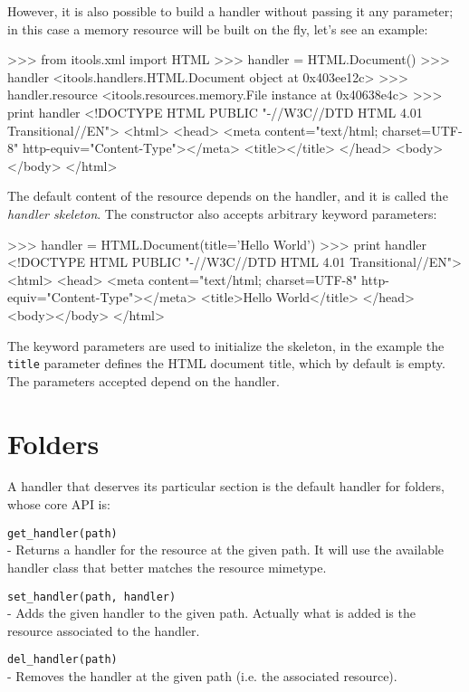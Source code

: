 However, it is also possible to build a handler without passing it any
parameter; in this case a memory resource will be built on the fly, let's
see an example:

\begin{code}
    >>> from itools.xml import HTML
    >>> handler = HTML.Document()
    >>> handler
    <itools.handlers.HTML.Document object at 0x403ee12c>
    >>> handler.resource
    <itools.resources.memory.File instance at 0x40638e4c>
    >>> print handler
    <!DOCTYPE HTML PUBLIC "-//W3C//DTD HTML 4.01 Transitional//EN">
    <html>
      <head>
        <meta content="text/html; charset=UTF-8" http-equiv="Content-Type"></meta>
        <title></title>
      </head>
      <body></body>
    </html>
\end{code}

The default content of the resource depends on the handler, and it is called
the {\em handler skeleton}. The constructor also accepts arbitrary keyword
parameters:

\begin{code}
    >>> handler = HTML.Document(title='Hello World')
    >>> print handler
    <!DOCTYPE HTML PUBLIC "-//W3C//DTD HTML 4.01 Transitional//EN">
    <html>
      <head>
        <meta content="text/html; charset=UTF-8" http-equiv="Content-Type"></meta>
        <title>Hello World</title>
      </head>
      <body></body>
    </html>
\end{code}

The keyword parameters are used to initialize the skeleton, in the example
the {\tt title} parameter defines the HTML document title, which by default
is empty. The parameters accepted depend on the handler.



\section{Folders}

A handler that deserves its particular section is the default handler for
folders, whose core API is:

\begin{api}
  {\tt get\_handler(path)}\\
  - Returns a handler for the resource at the given path. It will use the
    available handler class that better matches the resource mimetype.

  {\tt set\_handler(path, handler)}\\
  - Adds the given handler to the given path. Actually what is added is
    the resource associated to the handler.

  {\tt del\_handler(path)}\\
  - Removes the handler at the given path (i.e. the associated resource).
\end{api}

